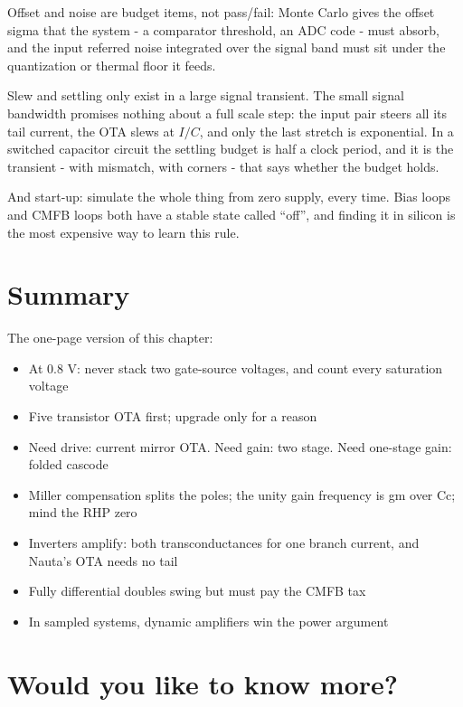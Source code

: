 Offset and noise are budget items, not pass/fail: Monte Carlo gives the
offset sigma that the system - a comparator threshold, an ADC code -
must absorb, and the input referred noise integrated over the signal
band must sit under the quantization or thermal floor it feeds.

Slew and settling only exist in a large signal transient. The small
signal bandwidth promises nothing about a full scale step: the input
pair steers all its tail current, the OTA slews at \(I/C\), and only the
last stretch is exponential. In a switched capacitor circuit the
settling budget is half a clock period, and it is the transient - with
mismatch, with corners - that says whether the budget holds.

And start-up: simulate the whole thing from zero supply, every time.
Bias loops and CMFB loops both have a stable state called ``off'', and
finding it in silicon is the most expensive way to learn this rule.

\section{Summary}\label{summary}

The one-page version of this chapter:

\begin{itemize}
\tightlist
\item
  At 0.8 V: never stack two gate-source voltages, and count every
  saturation voltage
\item
  Five transistor OTA first; upgrade only for a reason
\item
  Need drive: current mirror OTA. Need gain: two stage. Need one-stage
  gain: folded cascode
\item
  Miller compensation splits the poles; the unity gain frequency is gm
  over Cc; mind the RHP zero
\item
  Inverters amplify: both transconductances for one branch current, and
  Nauta's OTA needs no tail
\item
  Fully differential doubles swing but must pay the CMFB tax
\item
  In sampled systems, dynamic amplifiers win the power argument
\end{itemize}

\section{Would you like to know
more?}\label{would-you-like-to-know-more}

